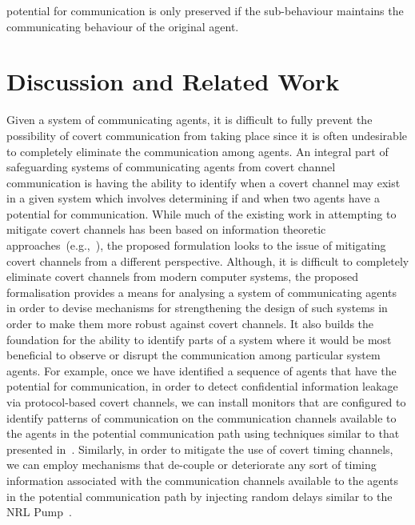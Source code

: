 \documentclass[copyright,creativecommons]{eptcs}
\makeatletter
\newcommand{\eg}{\textrm{e.g.,}\@\xspace}
\newcommand{\PFC}{potential for communication\@\xspace}
\newcommand{\soca}{system of communicating agents\@\xspace}
\newcommand{\socas}{systems of communicating agents\@\xspace}
\makeatother
\begin{document}
\PFC is only preserved if the sub-behaviour maintains the communicating behaviour of the original agent. 

%
 

\vspace{-0.175in}
\section{Discussion and Related Work}
\label{sec:discussion}
\vspace{-0.1in}
Given a \soca, it is difficult to fully prevent the possibility of covert communication from taking place since it is often undesirable to completely eliminate the communication among agents. An integral part of safeguarding \socas from covert channel communication is having the ability to identify when a covert channel may exist in a given system which involves determining if and when two agents have a \PFC. While much of the existing work in attempting to mitigate covert channels has been based on information theoretic approaches~(\eg~\cite{Gianvecchio2007aa,Giles2002aa,Giles1999aa,Helouet2010aa,Lowe2002aa,Martin2006aa,Millen1987aa,Millen1989aa,Moskowitz1994aa}), the proposed formulation looks to the issue of mitigating covert channels from a different perspective. Although, it is difficult to completely eliminate covert channels from modern computer systems, the proposed formalisation provides a means for analysing a \soca in order to devise mechanisms for strengthening the design of such systems in order to make them more robust against covert channels. It also builds the foundation for the ability to identify parts of a system where it would be most beneficial to observe or disrupt the communication among particular system agents. For example, once we have identified a sequence of agents that have the \PFC, in order to detect confidential information leakage via protocol-based covert channels, we can install monitors that are configured to identify patterns of communication on the communication channels available to the agents in the potential communication path using techniques similar to that presented in~\cite{Jaskolka2011ac}. Similarly, in order to mitigate the use of covert timing channels, we can employ mechanisms that de-couple or deteriorate any sort of timing information associated with the communication channels available to the agents in the potential communication path by injecting random delays similar to the NRL Pump~\cite{Kang1993aa}. 
\end{document}
